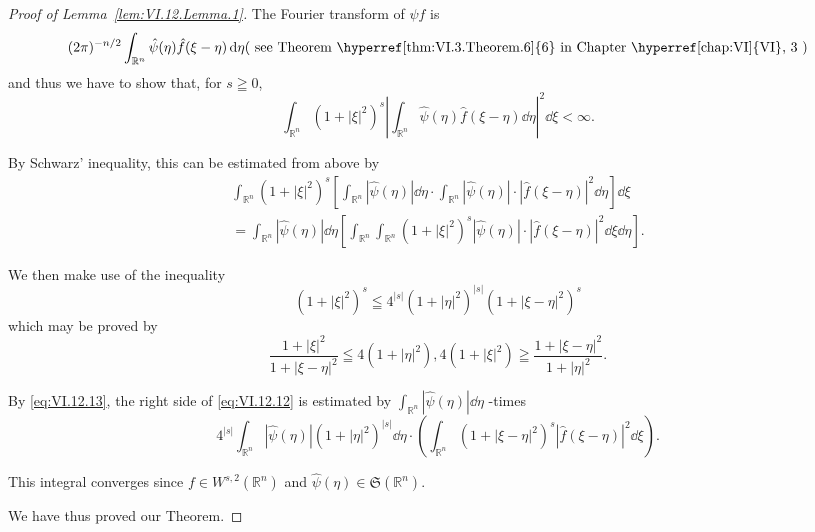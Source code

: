 \begin{proof}[Proof of Lemma~\ref{lem:VI.12.Lemma.1}]
 The Fourier transform of $\psi f$ is 
\[
(2 \pi) ^{-n/2} \int_ {\mathbb{R}^{n}} \hat {\psi} (\eta) \hat {f} (\xi - \eta) \dd \eta (\text{ see Theorem~\hyperref[thm:VI.3.Theorem.6]{6} in Chapter~\hyperref[chap:VI]{VI}, 3 })
\]
and thus we have to show that, for $s \geqq 0$, 
\[
\int_ {\mathbb{R}^{n}} (1 + | \xi | ^{2}) ^{s} \left| \int_ {\mathbb{R}^{n}} \hat {\psi} (\eta) \hat {f} (\xi - \eta) \dd \eta \right| ^{2} \dd \xi < \infty .
\]

By Schwarz' inequality, this can be estimated from above by 
\begin{equation}\label{eq:VI.12.12}
\begin{gathered}
\int_ {\mathbb{R}^{n}} (1 + | \xi | ^{2}) ^{s} \left[ \int_ {\mathbb{R}^{n}} | \hat {\psi} (\eta) | \dd \eta \cdot \int_ {\mathbb{R}^{n}} | \hat {\psi} (\eta) | \cdot | \hat {f} (\xi - \eta) | ^{2} \dd \eta \right] \dd \xi
\\
= \int_ {\mathbb{R}^{n}} | \hat {\psi} (\eta) | \dd \eta \left[ \int_ {\mathbb{R}^{n}} \int_ {\mathbb{R}^{n}} (1 + | \xi | ^{2}) ^{s} | \hat {\psi} (\eta) | \cdot | \hat {f} (\xi - \eta) | ^{2} \dd \xi \dd \eta \right].
\end{gathered}
\end{equation}

We then make use of the inequality 
\begin{equation}\label{eq:VI.12.13}
(1 + | \xi | ^{2}) ^{s} \leqq 4 ^{|s|} (1 + | \eta | ^{2}) ^{|s|} (1 + | \xi - \eta | ^{2}) ^{s}
\end{equation}
which may be proved by 
\[
\frac {1 + | \xi | ^{2}}{1 + | \xi - \eta | ^{2}} \leqq 4 (1 + | \eta | ^{2}), 4 (1 + | \xi | ^{2}) \geqq \frac {1 + | \xi - \eta | ^{2}}{1 + | \eta | ^{2}}.
\]

By \eqref{eq:VI.12.13}, the right side of \eqref{eq:VI.12.12} is estimated by $\int_{\mathbb{R}^{n}} |\hat{\psi}(\eta)| \dd\eta$ -times 
\[
4 ^{|s|} \int_ {\mathbb{R}^{n}} | \hat {\psi} (\eta) | (1 + | \eta | ^{2}) ^{|s|} \dd \eta \cdot \left(\int_ {\mathbb{R}^{n}} (1 + | \xi - \eta | ^{2}) ^{s} | \hat {f} (\xi - \eta) | ^{2} \dd \xi\right).
\]

This integral converges since $f \in W^{s,2}(\mathbb{R}^{n})$ and $\hat{\psi}(\eta) \in \mathfrak{S}(\mathbb{R}^{n})$. 

We have thus proved our Theorem.
\end{proof}


